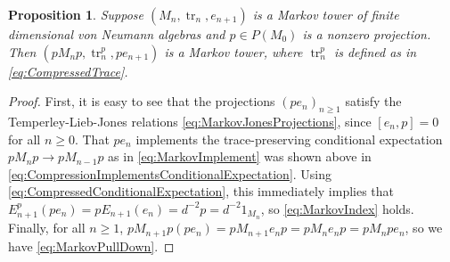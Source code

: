 \documentclass[11pt]{article}
\theoremstyle{plain}
\newtheorem{prop}[thm]{Proposition}
\theoremstyle{definition}
\DeclareMathOperator{\tr}{tr}
\begin{document}
\begin{prop}
Suppose $(M_n,\tr_n, e_{n+1})$ is a Markov tower of finite dimensional von Neumann algebras and $p\in P(M_0)$ is a nonzero projection.
Then $(pM_np, \tr_n^p, pe_{n+1})$ is a Markov tower, where $\tr_n^p$ is defined as in \eqref{eq:CompressedTrace}.
\end{prop}
\begin{proof}
First, it is easy to see that the projections $(pe_n)_{n\geq 1}$ satisfy the Temperley-Lieb-Jones relations \ref{eq:MarkovJonesProjections}, since $[e_n,p]=0$ for all $n\geq 0$.
That $pe_n$ implements the trace-preserving conditional expectation $pM_np \to pM_{n-1}p$ as in \ref{eq:MarkovImplement} was shown above in \eqref{eq:CompressionImplementsConditionalExpectation}.
Using \eqref{eq:CompressedConditionalExpectation}, this immediately implies that $E_{n+1}^p(pe_n) = pE_{n+1}(e_n) = d^{-2}p = d^{-2} 1_{M_n}$, so \ref{eq:MarkovIndex} holds.
Finally, for all $n\geq 1$, $pM_{n+1}p (pe_n) = pM_{n+1}e_np = pM_ne_np = pM_npe_n$, so we have \ref{eq:MarkovPullDown}.
\end{proof}
\end{document}
